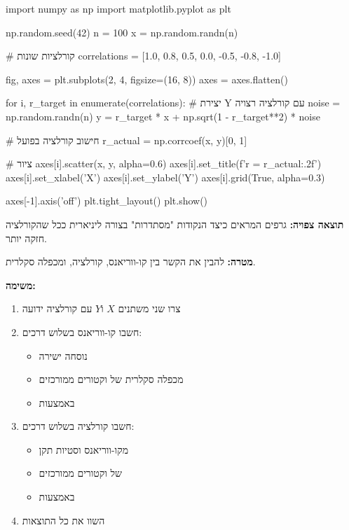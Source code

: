 \begin{pythonbox}
import numpy as np
import matplotlib.pyplot as plt

np.random.seed(42)
n = 100
x = np.random.randn(n)

# קורלציות שונות
correlations = [1.0, 0.8, 0.5, 0.0, -0.5, -0.8, -1.0]

fig, axes = plt.subplots(2, 4, figsize=(16, 8))
axes = axes.flatten()

for i, r_target in enumerate(correlations):
    # יצירת Y עם קורלציה רצויה
    noise = np.random.randn(n)
    y = r_target * x + np.sqrt(1 - r_target**2) * noise
    
    # חישוב קורלציה בפועל
    r_actual = np.corrcoef(x, y)[0, 1]
    
    # ציור
    axes[i].scatter(x, y, alpha=0.6)
    axes[i].set_title(f'r = {r_actual:.2f}')
    axes[i].set_xlabel('X')
    axes[i].set_ylabel('Y')
    axes[i].grid(True, alpha=0.3)

axes[-1].axis('off')
plt.tight_layout()
plt.show()
\end{pythonbox}

\textbf{תוצאה צפויה:} גרפים המראים כיצד הנקודות "מסתדרות" בצורה ליניארית ככל שהקורלציה חזקה יותר.


\textbf{מטרה:} להבין את הקשר בין קו-ווריאנס, קורלציה, ומכפלה סקלרית.

\textbf{משימה:}

\begin{enumerate}
\item צרו שני משתנים $X$ ו\en{-}$Y$ עם קורלציה ידועה
\item חשבו קו-ווריאנס בשלוש דרכים:
\begin{itemize}
\item נוסחה ישירה
\item מכפלה סקלרית של וקטורים ממורכזים
\item באמצעות 
\end{itemize}
\item חשבו קורלציה בשלוש דרכים:
\begin{itemize}
\item מקו-ווריאנס וסטיות תקן
\item {} של וקטורים ממורכזים
\item באמצעות 
\end{itemize}
\item השוו את כל התוצאות
\end{enumerate}

